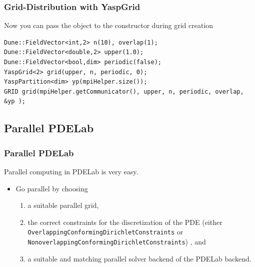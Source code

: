 \begin{frame}[fragile]
  \frametitle<presentation>{Grid-Distribution with YaspGrid}
Now you can pass the object to the constructor during grid creation
\begin{lstlisting}
Dune::FieldVector<int,2> n(10), overlap(1);
Dune::FieldVector<double,2> upper(1.0);
Dune::FieldVector<bool,dim> periodic(false);
YaspGrid<2> grid(upper, n, periodic, 0);
YaspPartition<dim> yp(mpiHelper.size());
GRID grid(mpiHelper.getCommunicator(), upper, n, periodic, overlap, &yp );
\end{lstlisting}
\end{frame}

\subsection{Parallel PDELab}

\begin{frame}
  \frametitle<presentation>{Parallel PDELab}
Parallel computing in PDELab is very easy. 
  \begin{itemize}
  \item Go parallel by choosing
    \begin{enumerate}
    \item a suitable parallel grid,
    \item the correct constraints for the discretization of
      the PDE (either \lstinline!OverlappingConformingDirichletConstraints! or \lstinline!NonoverlappingConformingDirichletConstraints!) , and
    \item a suitable and matching parallel solver backend of the
      PDELab backend.
    \end{enumerate}
  \end{itemize}
\end{frame}

